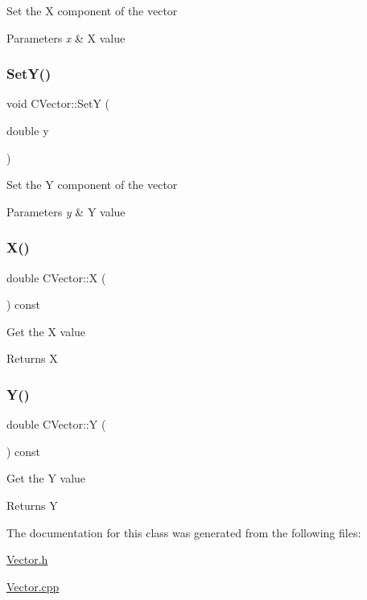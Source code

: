 Set the X component of the vector 
\begin{DoxyParams}{Parameters}
{\em x} & X value \\
\hline
\end{DoxyParams}
\mbox{\label{class_c_vector_af4527b22d2d04f9218802b55c4a12f77}} 
\subsubsection{\texorpdfstring{SetY()}{SetY()}}
{\footnotesize\ttfamily void C\+Vector\+::\+SetY (\begin{DoxyParamCaption}\item[{double}]{y }\end{DoxyParamCaption})\hspace{0.3cm}{\ttfamily [inline]}}

Set the Y component of the vector 
\begin{DoxyParams}{Parameters}
{\em y} & Y value \\
\hline
\end{DoxyParams}
\mbox{\label{class_c_vector_adb4201d69d28335e4778db12a63334dd}} 
\subsubsection{\texorpdfstring{X()}{X()}}
{\footnotesize\ttfamily double C\+Vector\+::X (\begin{DoxyParamCaption}{ }\end{DoxyParamCaption}) const\hspace{0.3cm}{\ttfamily [inline]}}

Get the X value \begin{DoxyReturn}{Returns}
X 
\end{DoxyReturn}
\mbox{\label{class_c_vector_a2307d1e05707ac82685fc5b7ec92df22}} 
\subsubsection{\texorpdfstring{Y()}{Y()}}
{\footnotesize\ttfamily double C\+Vector\+::Y (\begin{DoxyParamCaption}{ }\end{DoxyParamCaption}) const\hspace{0.3cm}{\ttfamily [inline]}}

Get the Y value \begin{DoxyReturn}{Returns}
Y 
\end{DoxyReturn}


The documentation for this class was generated from the following files\+:\begin{DoxyCompactItemize}
\item 
\mbox{\hyperlink{_vector_8h}{Vector.\+h}}\item 
\mbox{\hyperlink{_vector_8cpp}{Vector.\+cpp}}\end{DoxyCompactItemize}
